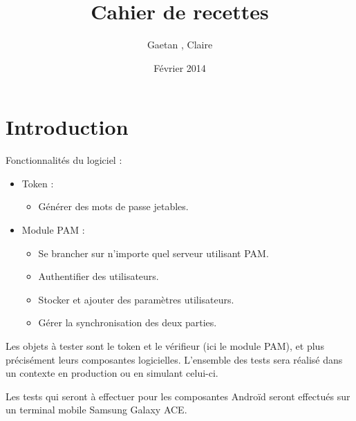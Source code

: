 \documentclass{"../../res/univ-projet"}
\title{Cahier de recettes}
\author{Gaetan \bsc{Ferry}, Claire \bsc{Hardouin}}
\date{Février 2014}
\begin{document}
  \maketitle
  \section{Introduction}
  Fonctionnalités du logiciel :
  \begin{itemize}
    \item Token : 
    \begin{itemize}
      \item Générer des mots de passe jetables.
    \end{itemize}

    \item Module PAM :
    \begin{itemize}
      \item Se brancher sur n'importe quel serveur utilisant PAM.
      \item Authentifier des utilisateurs.
      \item Stocker et ajouter des paramètres utilisateurs.
      \item Gérer la synchronisation des deux parties.
    \end{itemize}
  \end{itemize}

  Les objets à tester sont le token et le vérifieur (ici le module PAM), et plus précisément leurs
  composantes logicielles. L'ensemble des tests sera réalisé dans un contexte \og{}en 
  production\fg{} ou en simulant celui-ci.
  
  Les tests qui seront à effectuer pour les composantes Androïd seront effectués sur un terminal
  mobile Samsung Galaxy ACE.
  
\end{document}
